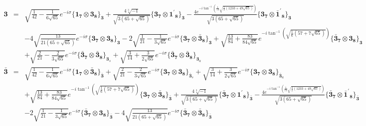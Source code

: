 \documentclass[english]{article}
\newcommand{\subcg}[3]{\big\{ {#1}\otimes{#2}\big\}^{}_{#3}}
\newcommand{\rep}[1]{\mathbf{#1}}
\begin{document}
\begin{itemize}
\begin{eqnarray*}
\\
\rep{3} &=& \sqrt{\frac{1}{42}-\frac{1}{6 \sqrt{65}}} e^{-i \sigma }\subcg{\rep{1}_{\rep{7}}}{\rep{3}_{\rep{8}}}{\rep{3}}+\frac{4 \sqrt[3]{-1}}{\sqrt{3 \left(65+\sqrt{65}\right)}}\subcg{\rep{3}_{\rep{7}}}{\rep{1^{\prime}}_{\rep{8}}}{\rep{3}}-\frac{4 e^{-i \tan ^{-1}\left(\frac{1}{73} \sqrt{\frac{3}{2} \left(1233+49 \sqrt{65}\right)}\right)}}{\sqrt{3 \left(65+\sqrt{65}\right)}}\subcg{\rep{3}_{\rep{7}}}{\rep{\bar{1}^{\prime}}_{\rep{8}}}{\rep{3}} \\ 
 & & -4 \sqrt{\frac{13}{21 \left(65+\sqrt{65}\right)}} e^{-i \sigma }\subcg{\rep{3}_{\rep{7}}}{\rep{3}_{\rep{8}}}{\rep{3}}-2 \sqrt{\frac{1}{21}-\frac{1}{3 \sqrt{65}}} e^{-i \sigma }\subcg{\rep{3}_{\rep{7}}}{\rep{\bar{3}}_{\rep{8}}}{\rep{3}}+\sqrt{\frac{13}{84}+\frac{83}{84 \sqrt{65}}} e^{-i \tan ^{-1}\left(\sqrt{\frac{1}{6} \left(57+7 \sqrt{65}\right)}\right)}\subcg{\rep{\bar{3}}_{\rep{7}}}{\rep{3}_{\rep{8}}}{\rep{3}} \\ 
 & & +\sqrt{\frac{2}{21}-\frac{2}{3 \sqrt{65}}} e^{-i \sigma }\subcg{\rep{\bar{3}}_{\rep{7}}}{\rep{\bar{3}}_{\rep{8}}}{\rep{3}_{s}}+\sqrt{\frac{3}{14}+\frac{3}{2 \sqrt{65}}} e^{-i \sigma }\subcg{\rep{\bar{3}}_{\rep{7}}}{\rep{\bar{3}}_{\rep{8}}}{\rep{3}_{a}}
\\
\rep{\bar{3}} &=& \sqrt{\frac{1}{42}-\frac{1}{6 \sqrt{65}}} e^{-i \sigma }\subcg{\rep{1}_{\rep{7}}}{\rep{\bar{3}}_{\rep{8}}}{\rep{\bar{3}}}+\sqrt{\frac{2}{21}-\frac{2}{3 \sqrt{65}}} e^{-i \sigma }\subcg{\rep{3}_{\rep{7}}}{\rep{3}_{\rep{8}}}{\rep{\bar{3}}_{s}}+\sqrt{\frac{3}{14}+\frac{3}{2 \sqrt{65}}} e^{-i \sigma }\subcg{\rep{3}_{\rep{7}}}{\rep{3}_{\rep{8}}}{\rep{\bar{3}}_{a}} \\ 
 & & +\sqrt{\frac{13}{84}+\frac{83}{84 \sqrt{65}}} e^{-i \tan ^{-1}\left(\sqrt{\frac{1}{6} \left(57+7 \sqrt{65}\right)}\right)}\subcg{\rep{3}_{\rep{7}}}{\rep{\bar{3}}_{\rep{8}}}{\rep{\bar{3}}}+\frac{4 \sqrt[3]{-1}}{\sqrt{3 \left(65+\sqrt{65}\right)}}\subcg{\rep{\bar{3}}_{\rep{7}}}{\rep{1^{\prime}}_{\rep{8}}}{\rep{\bar{3}}}-\frac{4 e^{-i \tan ^{-1}\left(\frac{1}{73} \sqrt{\frac{3}{2} \left(1233+49 \sqrt{65}\right)}\right)}}{\sqrt{3 \left(65+\sqrt{65}\right)}}\subcg{\rep{\bar{3}}_{\rep{7}}}{\rep{\bar{1}^{\prime}}_{\rep{8}}}{\rep{\bar{3}}} \\ 
 & & -2 \sqrt{\frac{1}{21}-\frac{1}{3 \sqrt{65}}} e^{-i \sigma }\subcg{\rep{\bar{3}}_{\rep{7}}}{\rep{3}_{\rep{8}}}{\rep{\bar{3}}}-4 \sqrt{\frac{13}{21 \left(65+\sqrt{65}\right)}} e^{-i \sigma }\subcg{\rep{\bar{3}}_{\rep{7}}}{\rep{\bar{3}}_{\rep{8}}}{\rep{\bar{3}}}
\end{eqnarray*}

\end{itemize}
\end{document}
